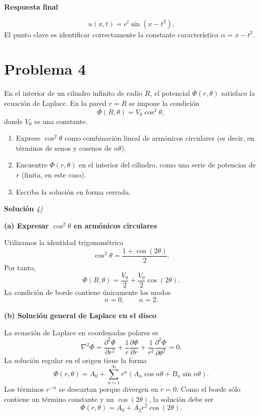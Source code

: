 \documentclass[12pt]{article}
\begin{document}
{\bf Respuesta final}

$$
\boxed{
u(x,t)=e^t\sin(x-t^2).
}
$$
El punto clave es identificar correctamente la constante característica $\alpha=x-t^2$.







\section*{Problema 4}
En el interior de un cilindro infinito de radio \(R\), el potencial \(\Phi(r, \theta)\) satisface la ecuación de Laplace. En la pared \(r = R\) se impone la condición
\[
\Phi(R, \theta) = V_0 \cos^2 \theta,
\]
donde \(V_0\) es una constante.
\begin{enumerate}
    \item[(a)] Exprese \(\cos^2 \theta\) como combinación lineal de armónicos circulares (es decir, en términos de senos y cosenos de \(n\theta\)).
    \item[(b)] Encuentre \(\Phi(r, \theta)\) en el interior del cilindro, como una serie de potencias de \(r\) (finita, en este caso).
    \item[(c)] Escriba la solución en forma cerrada.
\end{enumerate}

\vspace{0.5cm}
{\bf Soluci\'on }{\em 4)}
\vspace{0.5cm}

{\bf (a) Expresar $\cos^2\theta$ en armónicos circulares}

Utilizamos la identidad trigonométrica
$$
\cos^2\theta
=
\frac{1+\cos(2\theta)}{2}.
$$
Por tanto,
$$
\Phi(R,\theta)
=
\frac{V_0}{2}
+
\frac{V_0}{2}\cos(2\theta).
$$
La condición de borde contiene únicamente los modos
$$
n=0,
\qquad
n=2.
$$

{\bf (b) Solución general de Laplace en el disco}

La ecuación de Laplace en coordenadas polares es
$$
\nabla^2\Phi
=
\frac{\partial^2\Phi}{\partial r^2}
+\frac1r\frac{\partial\Phi}{\partial r}
+\frac1{r^2}
\frac{\partial^2\Phi}{\partial\theta^2}
=0.
$$
La solución regular en el origen tiene la forma
$$
\Phi(r,\theta)
=
A_0
+
\sum_{n=1}^{\infty}
r^n
\left(
A_n\cos n\theta
+
B_n\sin n\theta
\right).
$$
Los términos $r^{-n}$ se descartan porque divergen en $r=0$.
Como el borde sólo contiene un término constante y un $\cos(2\theta)$, la solución debe ser
$$
\Phi(r,\theta)
=
A_0+A_2r^2\cos(2\theta).
$$
\end{document}
